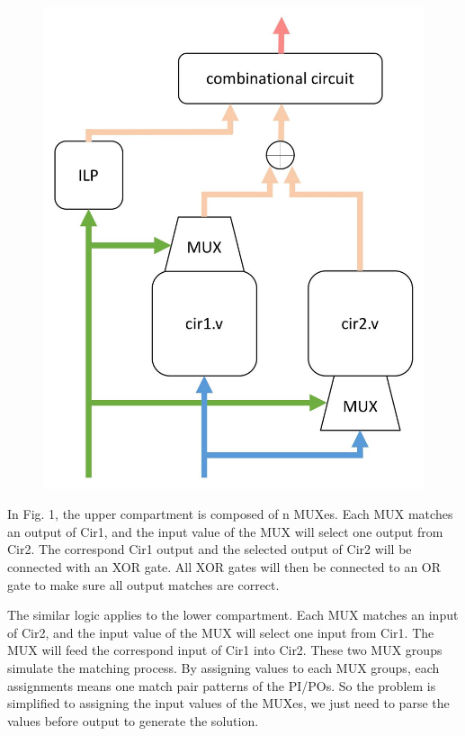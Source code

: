     \begin{figure}[H]
    \centering
    \includegraphics[scale=0.18]{images/structure}
    \caption{}
    \end{figure}

In Fig. 1, the upper compartment is composed of n MUXes. Each MUX matches an output of Cir1, and the input value of the MUX will select one output from Cir2. The correspond Cir1 output and the selected output of Cir2 will be connected with an XOR gate. All XOR gates will then be connected to an OR gate to make sure all output matches are correct.

The similar logic applies to the lower compartment. Each MUX matches an input of Cir2, and the input value of the MUX will select one input from Cir1. The MUX will feed the correspond input of Cir1 into Cir2.
These two MUX groups simulate the matching process. By assigning values to each MUX groups, each assignments means one match pair patterns of the PI/POs. So the problem is simplified to assigning the input values of the MUXes, we just need to parse the values before output to generate the solution.
